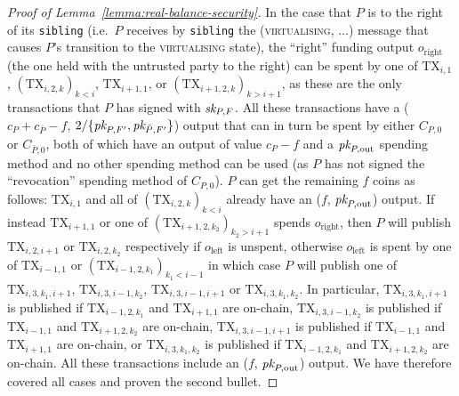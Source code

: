 \begin{proof}[Proof of Lemma~\ref{lemma:real-balance-security}]
  In the case that $P$ is to the right of its \texttt{sibling} (i.e.\ $P$
  receives by \texttt{sibling} the (\textsc{virtualising}, $\dots$) message that
  causes $P$'s transition to the \textsc{virtualising} state), the ``right''
  funding output $o_{\mathrm{right}}$ (the one held with the untrusted party to
  the right) can be spent by one of $\mathrm{TX}_{i, 1}$, $(\mathrm{TX}_{i, 2,
  k})_{k < i}$, $\mathrm{TX}_{i+1, 1}$, or $(\mathrm{TX}_{i+1, 2, k})_{k >
  i+1}$, as these are the only transactions that $P$ has signed with $\textit{sk}_{P,
  F}$. All these transactions have a ($c_P + c_{\bar{P}} - f$, $2/\{\textit{pk}_{P, F'},
  \textit{pk}_{\bar{P}, F'}\}$) output that can in turn be spent by either $C_{P, 0}$ or
  $C_{\bar{P}, 0}$, both of which have an output of value $c_P-f$ and a $\textit{pk}_{P,
  \mathrm{out}}$ spending method and no other spending method can be used (as
  $P$ has not signed the ``revocation'' spending method of $C_{P, 0}$). $P$ can
  get the remaining $f$ coins as follows: $\mathrm{TX}_{i, 1}$ and all of
  $(\mathrm{TX}_{i, 2, k})_{k < i}$ already have an ($f$, $\textit{pk}_{P,
  \mathrm{out}}$) output. If instead $\mathrm{TX}_{i+1, 1}$ or one of
  $(\mathrm{TX}_{i+1, 2, k_2})_{k_2 > i+1}$ spends $o_{\mathrm{right}}$, then
  $P$ will publish $\mathrm{TX}_{i, 2, i+1}$ or $\mathrm{TX}_{i, 2, k_2}$
  respectively if $o_{\mathrm{left}}$ is unspent, otherwise $o_{\mathrm{left}}$
  is spent by one of $\mathrm{TX}_{i-1, 1}$ or $(\mathrm{TX}_{i-1, 2, k_1})_{k_1
  < i-1}$ in which case $P$ will publish one of $\mathrm{TX}_{i, 3, k_1, i+1}$,
  $\mathrm{TX}_{i, 3, i-1, k_2}$, $\mathrm{TX}_{i, 3, i-1, i+1}$ or
  $\mathrm{TX}_{i, 3, k_1, k_2}$. In particular, $\mathrm{TX}_{i, 3, k_1, i+1}$
  is published if $\mathrm{TX}_{i-1, 2, k_1}$ and $\mathrm{TX}_{i+1, 1}$ are
  on-chain, $\mathrm{TX}_{i, 3, i-1, k_2}$ is published if $\mathrm{TX}_{i-1,
  1}$ and $\mathrm{TX}_{i+1, 2, k_2}$ are on-chain, $\mathrm{TX}_{i, 3, i-1,
  i+1}$ is published if $\mathrm{TX}_{i-1, 1}$ and $\mathrm{TX}_{i+1, 1}$ are
  on-chain, or $\mathrm{TX}_{i, 3, k_1, k_2}$ is published if $\mathrm{TX}_{i-1,
  2, k_1}$ and $\mathrm{TX}_{i+1, 2, k_2}$ are on-chain.  All these transactions
  include an ($f$, $\textit{pk}_{P, \mathrm{out}}$) output. We have therefore covered all
  cases and proven the second bullet.


\end{proof}
